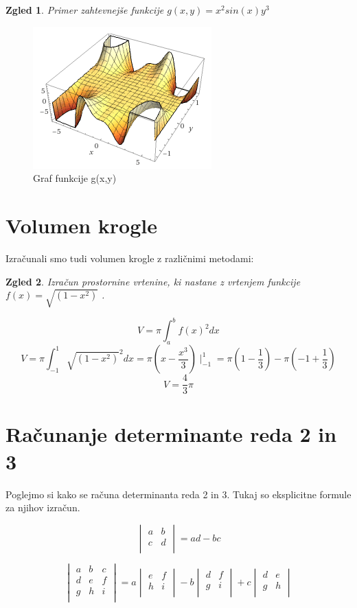 \documentclass[12pt, a4paper]{article}
\newtheorem{zgled}{Zgled}
\begin{document}
\newpage
\begin{zgled}
Primer zahtevnejše funkcije $g(x,y)=x^2 sin(x)y^3$ 
\end{zgled}

\begin{figure}[h!]
\centering
\includegraphics{funkcija_2.PNG}
\caption{Graf funkcije g(x,y)}
\end{figure}


\section{Volumen krogle}

Izračunali smo tudi volumen krogle z različnimi metodami: 

\begin{zgled} 
Izračun prostornine vrtenine, ki nastane z vrtenjem funkcije $f(x)=\sqrt{(1-x^2)}$ .

$$V=\pi \int_{a}^b{f(x)}^2dx$$
$$V=\pi \int_{-1}^1{{\sqrt{(1-x^2)}}}^2dx=\pi(x-\frac{x^3}{3})\mid_{-1}^1= \pi (1-\frac{1}{3})-\pi (-1+\frac{1}{3})$$
$$V=\frac{4}{3}\pi$$
\end{zgled}

\newpage
\section{Računanje determinante reda 2 in 3}

Poglejmo si kako se računa determinanta reda 2 in 3. Tukaj so eksplicitne formule za njihov izračun.

\[
\begin{vmatrix}
    a& b  \\
   c &d \\
\end{vmatrix}
=ad-bc
\]

\[
\begin{vmatrix}
 a&b&c\\
 d&e&f\\
 g&h&i\\
\end{vmatrix}
=a\begin{vmatrix}
e&f\\
h&i\\
\end{vmatrix}-b\begin{vmatrix}
d&f\\
g&i\\
\end{vmatrix}+c\begin{vmatrix}
d&e\\
g&h\\
\end{vmatrix}
\]
\end{document}
